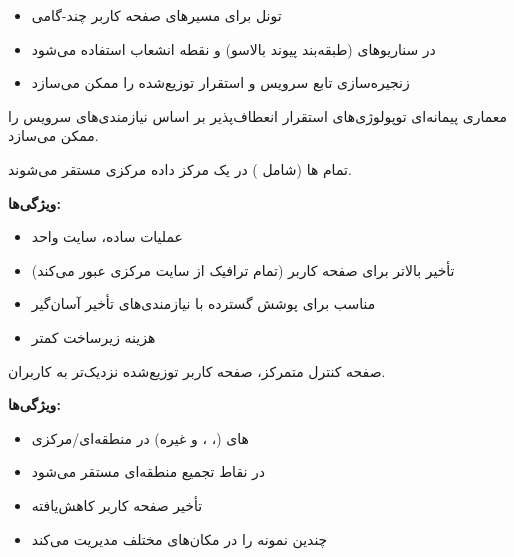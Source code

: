 
\begin{itemize}
\tightlist
\item
  تونل  برای مسیرهای صفحه کاربر چند-گامی
\item
  در سناریوهای  (طبقه‌بند پیوند بالاسو) و نقطه انشعاب استفاده می‌شود
\item
  زنجیره‌سازی تابع سرویس و استقرار  توزیع‌شده را ممکن می‌سازد
\end{itemize}


معماری پیمانه‌ای  توپولوژی‌های استقرار انعطاف‌پذیر بر اساس نیازمندی‌های سرویس را ممکن می‌سازد.


تمام ها (شامل ) در یک مرکز داده مرکزی مستقر می‌شوند.

\textbf{ویژگی‌ها:}

\begin{itemize}
\tightlist
\item
  عملیات ساده، سایت واحد
\item
  تأخیر بالاتر برای صفحه کاربر (تمام ترافیک از سایت مرکزی عبور می‌کند)
\item
  مناسب برای پوشش گسترده با نیازمندی‌های تأخیر آسان‌گیر
\item
  هزینه زیرساخت کمتر
\end{itemize}


صفحه کنترل متمرکز، صفحه کاربر توزیع‌شده نزدیک‌تر به کاربران.

\textbf{ویژگی‌ها:}

\begin{itemize}
\tightlist
\item
  های  (، ،  و غیره) در  منطقه‌ای/\allowbreak{}مرکزی
\item
   در نقاط تجمیع منطقه‌ای مستقر می‌شود
\item
  تأخیر صفحه کاربر کاهش‌یافته
\item
   چندین نمونه  را در مکان‌های مختلف مدیریت می‌کند
\end{itemize}


